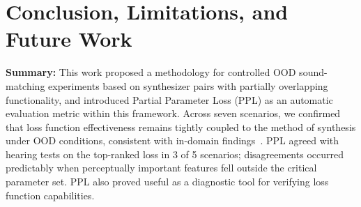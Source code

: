 \documentclass[10pt]{article} %
\newcommand{\SIMSESpec}{\texttt{SIMSE\_\allowbreak Spec}\xspace}
\newcommand{\JTFS}{\texttt{JTFS}\xspace}
\newcommand{\DTWEnv}{\texttt{DTW\_\allowbreak Envelope}\xspace}
\begin{document}
\section{Conclusion, Limitations, and Future Work}

\textbf{Summary:} This work proposed a methodology for controlled OOD sound-matching experiments based on synthesizer pairs with partially overlapping functionality, and introduced Partial Parameter Loss (PPL) as an automatic evaluation metric within this framework. Across seven scenarios, we confirmed that loss function effectiveness remains tightly coupled to the method of synthesis under OOD conditions, consistent with in-domain findings~\cite{salimi2025evaluating}. PPL agreed with hearing tests on the top-ranked loss in 3 of 5 scenarios; disagreements occurred predictably when perceptually important features fell outside the critical parameter set. PPL also proved useful as a diagnostic tool for verifying loss function capabilities.


\end{document}
